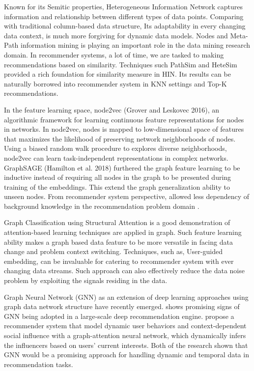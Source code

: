 \documentclass[12pt,a4 paper,title page]{article}
\theoremstyle{definition}
\begin{document}
Known for its Semitic properties, Heterogeneous Information Network captures information and relationship between different types of data points. Comparing with traditional column-based data structure, Its adaptability in every changing data context, is much more forgiving for dynamic data models. Nodes and Meta-Path information mining is playing an important role in the data mining research domain. In recommender systems, a lot of time, we are tasked to making recommendations based on similarity. Techniques such PathSim \citep{Sun2011PathSim} and HeteSim \citep{Shi2013HeteSim} provided a rich foundation for similarity measure in HIN. Its results can be naturally borrowed into recommender system in KNN settings and Top-K recommendations. 

In the feature learning space, node2vec (Grover and Leskovec 2016), an algorithmic framework for learning continuous feature representations for nodes in networks. In node2vec, nodes is mapped to low-dimensional space of features that maximizes the likelihood of preserving network neighborhoods of nodes. Using a biased random walk procedure to explores diverse neighborhoods, node2vec can learn task-independent representations in complex networks. GraphSAGE (Hamilton et al. 2018) furthered the graph feature learning to be inductive instead of requiring all nodes in the graph to be presented during training of the embeddings. This extend the graph generalization ability to unseen nodes. From recommender system perspective, allowed less dependency of background knowledge in the recommendation problem domain \citep{Hu2018}.  

Graph Classification using Structural Attention \citep{lee2018graph} is a good demonstration of attention-based learning techniques are applied in graph. Such feature learning ability makes a graph based data feature to be more versatile in facing data change and problem context switching. 
Techniques, such as, User-guided embedding, can be invaluable for catering to recommender system with ever changing data streams. Such approach can also effectively reduce the data noise problem by exploiting the signals residing in the data.  

Graph Neural Network (GNN) as an extension of deep learning approaches using graph data network structure have recently emerged. \citet{ying2018graph} shows promising signs of GNN being adopted in a large-scale deep recommendation engine. \citet{song2019session} propose a recommender system that model dynamic user behaviors and context-dependent social influence with a graph-attention neural network, which dynamically infers the influencers based on users’ current interests. Both of the research shown that GNN would be a promising approach for handling dynamic and temporal data in recommendation tasks.
\end{document}
